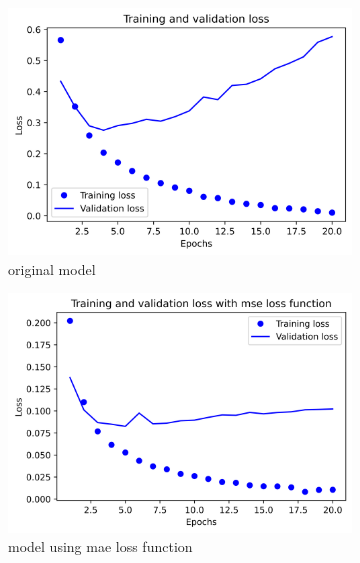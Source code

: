 \documentclass{article}
\begin{document}
    \begin{figure}[H]
        \begin{subfigure}{.5\textwidth}
            \centering
            \includegraphics[width=\linewidth]{images/movies/original.png}
            \caption{original model}
            \label{fig3:sfig1}
        \end{subfigure}
        \begin{subfigure}{.5\textwidth}
            \centering
            \includegraphics[width=\linewidth]{images/movies/6.png}
            \caption{model using mae loss function}
            \label{fig3:sfig2}
        \end{subfigure}
        \begin{subfigure}{.5\textwidth}
            \centering

\end{subfigure}
\end{figure}
\end{document}
